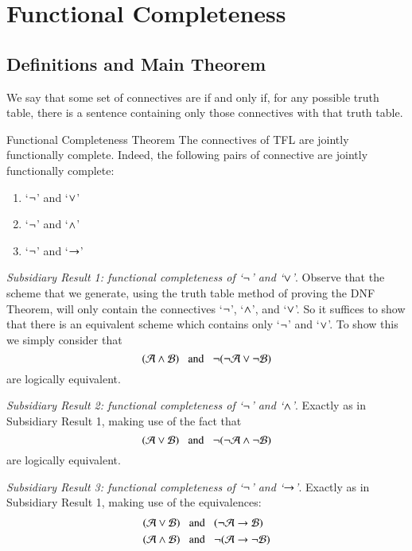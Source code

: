 \documentclass[12pt, a4paper, twoside, openright, titlepage]{book}
\begin{document}
\chapter{\textsection\textsection Functional Completeness}

\section{\textsection Definitions and Main Theorem}

\begin{defn}{}{}
    We say that some set of connectives are  if and only if, for any possible truth table, there is a sentence containing only those connectives with that truth table.
\end{defn}

\begin{namthm}{Functional Completeness Theorem}{}
    The connectives of TFL are jointly functionally complete. Indeed, the following pairs of connective are jointly functionally complete: \begin{enumerate}
        \item `$\neg$' and `$\vee$'
        \item `$\neg$' and `$\wedge$'
        \item `$\neg$' and `$\rightarrow$'
    \end{enumerate}
\end{namthm}
\begin{proof*}{}{}
    \emph{Subsidiary Result 1: functional completeness of `$\neg$' and `$\vee$'}. Observe that the scheme that we generate, using the truth table method of proving the DNF Theorem, will only contain the connectives `$\neg$', `$\wedge$', and `$\vee$'. So it suffices to show that there is an equivalent scheme which contains only `$\neg$' and `$\vee$'. To show this we simply consider that \begin{equation*}
        (\mathcal{A}\wedge\mathcal{B}) \;\;\text{ and }\;\;\neg(\neg\mathcal{A}\vee\neg\mathcal{B})
    \end{equation*}
    are logically equivalent.

    \emph{Subsidiary Result 2: functional completeness of `$\neg$' and `$\wedge$'}. Exactly as in Subsidiary Result 1, making use of the fact that \begin{equation*}
        (\mathcal{A}\vee\mathcal{B}) \;\;\text{ and }\;\;\neg(\neg\mathcal{A}\wedge\neg\mathcal{B})
    \end{equation*}
    are logically equivalent.

    \emph{Subsidiary Result 3: functional completeness of `$\neg$' and `$\rightarrow$'}. Exactly as in Subsidiary Result 1, making use of the equivalences: \begin{align*}
        (\mathcal{A}\vee\mathcal{B})\;\;&\text{ and }\;\;(\neg\mathcal{A}\rightarrow \mathcal{B}) \\
        (\mathcal{A}\wedge\mathcal{B})\;\;&\text{ and }\;\;\neg(\mathcal{A}\rightarrow\neg\mathcal{B})
    \end{align*}
\end{proof*}
\end{document}
